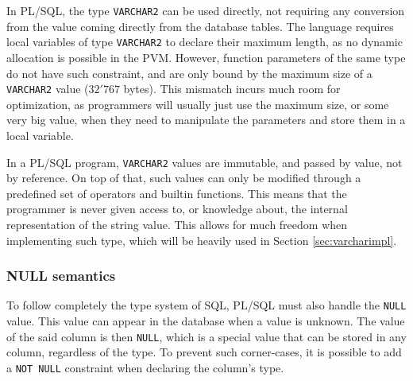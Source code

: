 \documentclass[twoside,11pt,a4paper]{article}
\newcommand{\pls}[1]{\small\texttt{#1}\normalsize}
\newcommand{\plstype}[1]{\pls{#1}}
\newcommand{\varchar}{\plstype{VARCHAR2}}
\newcommand{\plsnull}{\pls{NULL}}
\newcommand{\notnull}{\pls{NOT NULL}}
\begin{document}
In PL/SQL, the type \varchar{} can be used directly, not requiring any conversion from the value coming directly from the database tables. The language requires local variables of type \varchar{} to declare their maximum length, as no dynamic allocation is possible in the PVM. However, function parameters of the same type do not have such constraint, and are only bound by the maximum size of a \varchar{} value ($32'767$ bytes). This mismatch incurs much room for optimization, as programmers will usually just use the maximum size, or some very big value, when they need to manipulate the parameters and store them in a local variable.

In a PL/SQL program, \varchar{} values are immutable, and passed by value, not by reference. On top of that, such values can only be modified through a predefined set of operators and builtin functions. This means that the programmer is never given access to, or knowledge about, the internal representation of the string value. This allows for much freedom when implementing such type, which will be heavily used in Section \ref{sec:varcharimpl}.

\subsubsection{NULL semantics}

\label{sec:nullsemantics}


To follow completely the type system of SQL, PL/SQL must also handle the \plsnull{} value. This value can appear in the database when a value is unknown. The value of the said column is then \plsnull{}, which is a special value that can be stored in any column, regardless of the type. To prevent such corner-cases, it is possible to add a \notnull{} constraint when declaring the column's type.
\end{document}
